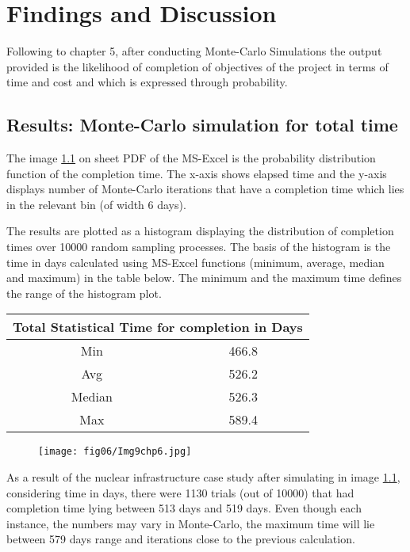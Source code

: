 \let\textcircled=\pgftextcircled
\chapter{Findings and Discussion}
\label{chapFD}

Following to chapter 5, after conducting Monte-Carlo Simulations the output provided is the likelihood of completion of objectives of the project in terms of time and cost and which is expressed through probability.

\section{Results: Monte-Carlo simulation for total time} 
\label{section6.1}

The image \ref{img9ch6} on sheet PDF of the MS-Excel is the probability distribution function of the completion time. The x-axis shows elapsed time and the y-axis displays number of Monte-Carlo iterations that have a completion time which lies in the relevant bin (of width 6 days).

The results are plotted as a histogram displaying the distribution of completion times over 10000 random sampling processes. 
The basis of the histogram is the time in days calculated using MS-Excel functions (minimum, average, median and maximum) in the table below. The minimum and the maximum time defines the range of the histogram plot.

\begin{center}
	\begin{tabular}{ |c|c|} 
		\hline
		\multicolumn{2}{|c|}{Total Statistical Time for completion in Days} \\
		\hline
		Min & 466.8  \\
		\hline
		Avg& 526.2 \\ 
		\hline
		Median &526.3 \\ 
		\hline
		Max& 589.4\\ 
		\hline
	\end{tabular}
\end{center}

\begin{figure}
	\centering
	\texttt{[image: fig06/Img9chp6.jpg]}
	\label{img9ch6}
\end{figure}

 As a result of the nuclear infrastructure case study after simulating in image \ref{img9ch6}, considering time in days, there were 1130 trials (out of 10000) that had completion time lying between 513 days and 519 days. Even though each instance, the numbers may vary in Monte-Carlo, the maximum time will lie between 579 days range and iterations close to the previous calculation.
 

